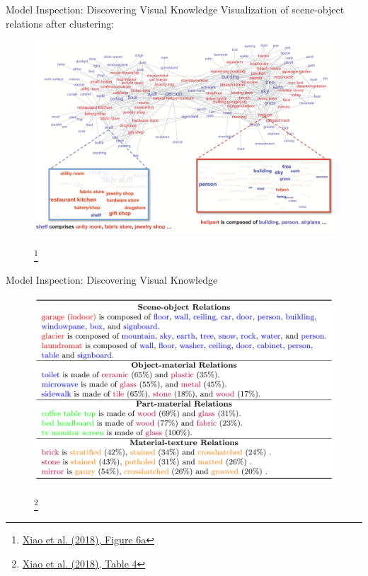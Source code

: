 \documentclass{beamer}
\newcommand\blfootnote[1]{
  \begingroup
  \renewcommand\thefootnote{}\footnote{#1}
  \addtocounter{footnote}{-1}
  \endgroup
}
\begin{document}
\begin{frame}{Model Inspection: Discovering Visual Knowledge}
  Visualization of scene-object relations after clustering:
  \vspace{-0.25cm}
  \begin{figure}
    \centering
    \includegraphics[width=\textwidth]{Images/Figure6a.png}
    \blfootnote{\href{https://doi.org/10.48550/arXiv.1807.10221}{Xiao et al. (2018), Figure 6a}}
  \end{figure}
  \vspace{-1cm}
\end{frame}

\begin{frame}{Model Inspection: Discovering Visual Knowledge}
  \begin{figure}
    \centering
    \includegraphics[width=\textwidth]{Images/Table4.png}
    \blfootnote{\href{https://doi.org/10.48550/arXiv.1807.10221}{Xiao et al. (2018), Table 4}}
  \end{figure}
\end{frame}
\end{document}
